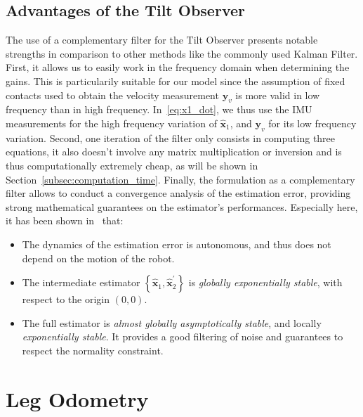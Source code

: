 \documentclass{IJCAS}
\begin{document}
\subsection{Advantages of the Tilt Observer}
The use of a complementary filter for the Tilt Observer presents notable strengths in comparison to other methods like the commonly used Kalman Filter. First, it allows us to easily work in the frequency domain when determining the gains. This is particularily suitable for our model since the assumption of fixed contacts used to obtain the velocity measurement $\boldsymbol{y}_v$ is more valid in low frequency than in high frequency. In~\eqref{eq:x1_dot}, we thus use the IMU measurements for the high frequency variation of $\hat{\boldsymbol{x}}_{1}$, and $\boldsymbol{y}_v$ for its low frequency variation. Second, one iteration of the filter only consists in computing three equations, it also doesn't involve any matrix multiplication or inversion and is thus computationally extremely cheap, as will be shown in Section~\ref{subsec:computation_time}. Finally, the formulation as a complementary filter allows to conduct a convergence analysis of the estimation error, providing strong mathematical guarantees on the estimator's performances. Especially here, it has been shown in~\cite{benallegue2020LyapunovStableOrientationEstimatorHumanoids} that:
\begin{itemize}
    \item The dynamics of the estimation error is autonomous, and thus does not depend on the motion of the robot. 
    \item The intermediate estimator $\left\{\hat{\boldsymbol{x}}_{1}, \hat{\boldsymbol{x}}_{2}^{\prime} \right\}$ is \emph{globally exponentially stable}, with respect to the origin $\left(0,0\right)$.
    \item The full estimator is \emph{almost globally asymptotically stable}, and locally \emph{exponentially stable}. It provides a good filtering of noise and guarantees to respect the normality constraint.
\end{itemize}

\section{Leg Odometry}
\label{sec:leg_odometry}
\end{document}

